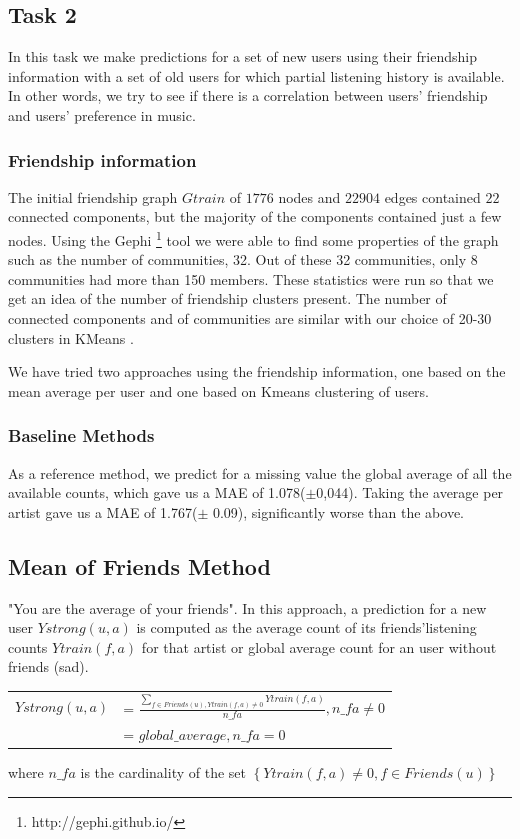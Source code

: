 \subsection{Task 2}
In this task we make predictions for a set of new users using their friendship information with a set of old users for which partial listening history is available. In other words, we try to see if there is a correlation between
users' friendship and users' preference in music.

\subsubsection{Friendship information}
The initial friendship graph $Gtrain$ of $1776$ nodes and $22904$ edges contained $22$ connected components, but the majority of the components contained just a few nodes.
Using the Gephi  \footnote{http://gephi.github.io/} tool we were able to find some properties of the graph such as the number of communities, 32.  Out of these 32 communities, only 8 communities had more than 150 members.
These statistics were run so that we get an idea of the number of friendship clusters present. The number of connected components and of communities are similar with our choice of 20-30 clusters in KMeans .

We have tried two approaches using the friendship information, one based on the mean average per user and one based on Kmeans clustering of users.

\subsubsection{Baseline Methods}
As a reference method, we predict for a missing value the global average of all the available counts, which gave us a MAE of 1.078($\pm$0,044). Taking the average per artist gave us a MAE of 1.767($\pm$  0.09), significantly worse than the above.

\subsection{Mean of Friends Method}
 "You are the average of your friends". In this approach, a prediction for a new user $Ystrong(u,a)$ is computed as the average count of its friends'listening counts $Ytrain(f,a)$ for that artist or global average count for an user without friends (sad).

\begin{table}[h]
  \centering
  \begin{tabular}{ c  l }
  $Ystrong(u,a) $&= $\frac{\sum_{f\in Friends(u), Ytrain(f,a)\neq0}{Ytrain(f,a)}}{n\_fa}, n\_fa \neq 0$ \\ 
                          &= $global\_average, n\_fa = 0$ \\ 
  \end{tabular}
\end{table}
where $n\_fa$ is the cardinality of the set $\left\{ Ytrain(f,a)\neq0, f\in Friends(u)\right\}$

